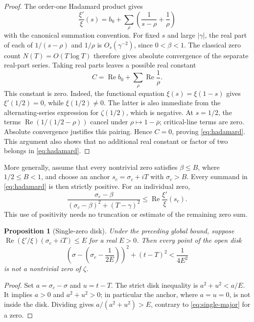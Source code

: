 \documentclass[11pt,a4paper]{article}
\newtheorem{proposition}[theorem]{Proposition}
\theoremstyle{definition}
\newcommand{\Rea}{\operatorname{Re}}
\begin{document}
\begin{proof}
The order-one Hadamard product gives
\[
 \frac{\xi'}{\xi}(s)
 =b_0+\sum_\rho\left(\frac1{s-\rho}+\frac1\rho\right)
\]
with the canonical summation convention. For fixed $s$ and large
$|\gamma|$, the real part of each of $1/(s-\rho)$ and $1/\rho$
is $O_s(\gamma^{-2})$, since $0<\beta<1$. The classical zero count
$N(T)=O(T\log T)$ therefore gives absolute convergence of the separate
real-part series. Taking real parts leaves a possible real constant
\[
 C=\Rea b_0+\sum_\rho\Rea\frac1\rho.
\]
This constant is zero. Indeed, the functional equation
$\xi(s)=\xi(1-s)$ gives $\xi'(1/2)=0$, while $\xi(1/2)\ne0$.
The latter is also immediate from the alternating-series expression
for $\zeta(1/2)$, which is negative. At $s=1/2$, the terms
$\Rea(1/(1/2-\rho))$ cancel under
$\rho\mapsto1-\overline\rho$; critical-line terms are zero.
Absolute convergence justifies this pairing. Hence $C=0$, proving
\eqref{eq:hadamard}. This argument also shows that no additional real
constant or factor of two belongs in \eqref{eq:hadamard}.
\end{proof}

More generally, assume that every nontrivial zero satisfies
$\beta\le B$, where $1/2\le B<1$, and choose an anchor
$s_c=\sigma_c+iT$ with $\sigma_c>B$. Every summand in
\eqref{eq:hadamard} is then strictly positive. For an individual zero,
\begin{equation}\label{eq:single-major}
 \frac{\sigma_c-\beta}{(\sigma_c-\beta)^2+(T-\gamma)^2}
 \le \Rea\frac{\xi'}{\xi}(s_c).
\end{equation}
This use of positivity needs no truncation or estimate of the remaining
zero sum.

\begin{proposition}[Single-zero disk]\label{prop:disk}
Under the preceding global bound, suppose
$\Rea(\xi'/\xi)(\sigma_c+iT)\le E$ for a real $E>0$. Then every
point of the open disk
\begin{equation}\label{eq:disk}
 \left(\sigma-\left(\sigma_c-\frac1{2E}\right)\right)^2
 +(t-T)^2<\frac1{4E^2}
\end{equation}
is not a nontrivial zero of $\zeta$.
\end{proposition}

\begin{proof}
Set $a=\sigma_c-\sigma$ and $u=t-T$. The strict disk inequality is
$a^2+u^2<a/E$. It implies $a>0$ and $a^2+u^2>0$; in particular
the anchor, where $a=u=0$, is not inside the disk. Dividing gives
$a/(a^2+u^2)>E$, contrary to \eqref{eq:single-major} for a zero.
\end{proof}
\end{document}
